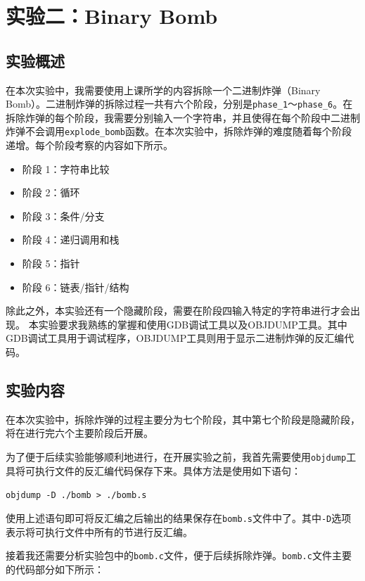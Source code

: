 \documentclass{paper}
\begin{document}
\tableofcontents
\newpage

\section{实验二：Binary Bomb}

\subsection{实验概述}

在本次实验中，我需要使用上课所学的内容拆除一个二进制炸弹（Binary Bomb）。二进制炸弹的拆除过程一共有六个阶段，分别是\verb|phase_1|～\verb|phase_6|。在拆除炸弹的每个阶段，我需要分别输入一个字符串，并且使得在每个阶段中二进制炸弹不会调用\verb|explode_bomb|函数。在本次实验中，拆除炸弹的难度随着每个阶段递增。每个阶段考察的内容如下所示。

\begin{itemize}
    \item 阶段 1：字符串比较
    \item 阶段 2：循环
    \item 阶段 3：条件/分支
    \item 阶段 4：递归调用和栈
    \item 阶段 5：指针
    \item 阶段 6：链表/指针/结构
\end{itemize}

除此之外，本实验还有一个隐藏阶段，需要在阶段四输入特定的字符串进行才会出现。
本实验要求我熟练的掌握和使用GDB调试工具以及OBJDUMP工具。其中GDB调试工具用于调试程序，OBJDUMP工具则用于显示二进制炸弹的反汇编代码。

\subsection{实验内容}

在本次实验中，拆除炸弹的过程主要分为七个阶段，其中第七个阶段是隐藏阶段，将在进行完六个主要阶段后开展。

为了便于后续实验能够顺利地进行，在开展实验之前，我首先需要使用\verb|objdump|工具将可执行文件的反汇编代码保存下来。具体方法是使用如下语句：

\verb|objdump -D ./bomb > ./bomb.s|

使用上述语句即可将反汇编之后输出的结果保存在\verb|bomb.s|文件中了。其中\verb|-D|选项表示将可执行文件中所有的节进行反汇编。

接着我还需要分析实验包中的\verb|bomb.c|文件，便于后续拆除炸弹。\verb|bomb.c|文件主要的代码部分如下所示：
\end{document}
